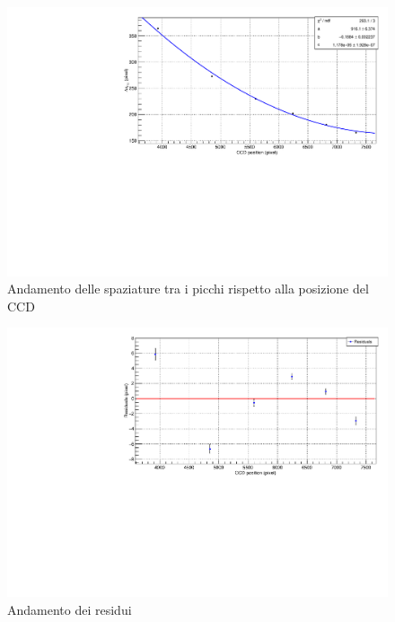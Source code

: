 \documentclass{article}
\begin{document}
	\begin{center}
		\begin{figure}[H]
			\centering
			\includegraphics[scale=0.38, angle=0]{campospento/deltaxruBoff.pdf}
			\caption{Andamento delle spaziature tra i picchi rispetto alla posizione del CCD}
			\label{fig:deltaxruBoff}
		\end{figure}
	\end{center}

	\begin{center}
		\begin{figure}[H]
			\centering
			\includegraphics[scale=0.38, angle=0]{campospento/deltaxruBoffres.pdf}
			\caption{Andamento dei residui}
			\label{fig:deltaxruBoffres}
		\end{figure}
	\end{center}
\end{document}

